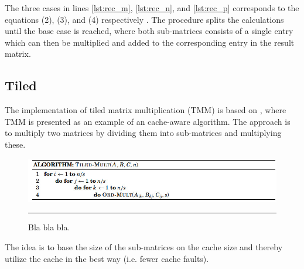 The three cases in lines \ref{lst:rec_m}, \ref{lst:rec_n}, and \ref{lst:rec_p} corresponds to the equations (2), (3), and (4) respectively \citep{matrixMultiplication}.
The procedure splits the calculations until the base case is reached, where both sub-matrices consists of a single entry which can then be multiplied and added to the corresponding entry in the result matrix.



\subsection{Tiled}
The implementation of tiled matrix multiplication (TMM) is based on \citep{matrixMultiplication}, where TMM is presented as an example of an cache-aware algorithm. 
The approach is to multiply two matrices by dividing them into sub-matrices and multiplying these. 
\begin{figure}[htbp]
	\centering
		\includegraphics[width=\textwidth]{./Figures/Project2a/TiledMulti_Pseudo.jpg}
		\rule{35em}{0.5pt}
	\caption[Pseudocode for tiled multiplication]{
	Bla bla bla.
	}
	\label{fig:TiledMulti_Pseudo}
\end{figure}
The idea is to base the size of the sub-matrices on the cache size and thereby utilize the cache in the best way (i.e. fewer cache faults).   

